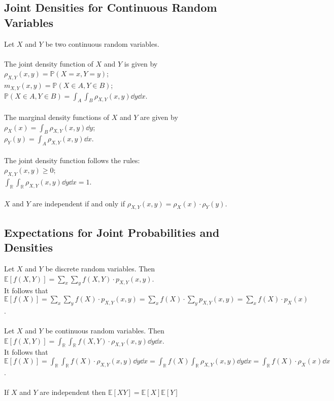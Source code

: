 \documentclass{article}
\begin{document}
		\subsection{Joint Densities for Continuous Random Variables}
			Let $X$ and $Y$ be two continuous random variables. \\
			\\
			The joint density function of $X$ and $Y$ is given by \\
			\textbullet \; $\rho_{X,Y}(x,y) = \mathbb{P}(X = x, Y = y)$; \\
			\textbullet \; $m_{X,Y}(x,y) = \mathbb{P}(X \in A, Y \in B)$; \\
			\textbullet \; $\mathbb{P}(X \in A, Y \in B) = \int_A \int_B \rho_{X,Y}(x,y) \dd{y} \dd{x}$. \\
			\\
			The marginal density functions of $X$ and $Y$ are given by \\
			\textbullet \; $\rho_X(x) = \int_B \rho_{X,Y}(x,y) \dd{y}$; \\
			\textbullet \; $\rho_Y(y) = \int_A \rho_{X,Y}(x,y) \dd{x}$. \\
			\\
			The joint density function follows the rules: \\
			\textbullet \; $\rho_{X,Y}(x,y) \geq 0$; \\
			\textbullet \; $\int_{\mathbb{R}} \int_{\mathbb{R}} \rho_{X,Y}(x,y) \dd{y} \dd{x} = 1$. \\
			\\
			$X$ and $Y$ are independent if and only if $\rho_{X,Y}(x,y) = \rho_{X}(x) \cdot \rho_{Y}(y)$. \\
			
		\subsection{Expectations for Joint Probabilities and Densities}
			Let $X$ and $Y$ be discrete random variables. Then $\mathbb{E}[f(X,Y)] = \sum_x \sum_y f(X,Y) \cdot p_{X,Y}(x,y)$. \\
			It follows that $\mathbb{E}[f(X)] = \sum_x \sum_y f(X) \cdot p_{X,Y}(x,y) = \sum_x f(X) \cdot \sum_y p_{X,Y}(x,y) = \sum_x f(X) \cdot p_X(x)$. \\
			\\
			Let $X$ and $Y$ be continuous random variables. Then $\mathbb{E}[f(X,Y)] = \int_{\mathbb{R}} \int_{\mathbb{R}} f(X,Y) \cdot \rho_{X,Y}(x,y) \dd{y} \dd{x}$. \\
			It follows that $\mathbb{E}[f(X)] = \int_{\mathbb{R}} \int_{\mathbb{R}} f(X) \cdot \rho_{X,Y}(x,y) \dd{y} \dd{x} = \int_{\mathbb{R}} f(X) \int_{\mathbb{R}} \rho_{X,Y}(x,y) \dd{y} \dd{x} = \int_{\mathbb{R}} f(X) \cdot \rho_X(x) \dd{x}$. \\
			\\
			If $X$ and $Y$ are independent then $\mathbb{E}[XY] = \mathbb{E}[X] \mathbb{E}[Y]$ \\
			
\end{document}
